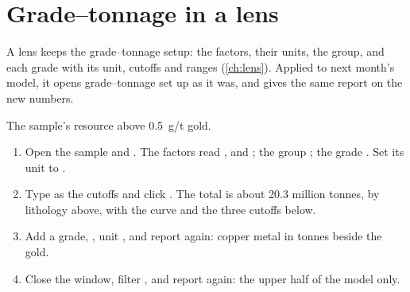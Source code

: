 \section{Grade–tonnage in a lens}

A lens keeps the grade–tonnage setup: the factors, their units, the group, and each grade with its unit,
cutoffs and ranges (\cref{ch:lens}). Applied to next month's model, it opens grade–tonnage set up as it
was, and  gives the same report on the new numbers.

\begin{tryit}
The sample's resource above 0.5~g/t gold.
\begin{enumerate}
\item Open the sample and . The factors read ,
 and ; the group ; the grade . Set its unit to
.
\item Type  as the cutoffs and click . The total is about 20.3 million tonnes,
by lithology above, with the curve and the three cutoffs below.
\item Add a grade, , unit \ui{\%}, and report again: copper metal in tonnes beside the gold.
\item Close the window, filter , and report again: the upper half of the model only.
\end{enumerate}
\end{tryit}

